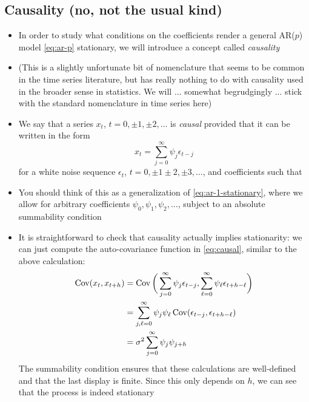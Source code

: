 \documentclass{article}
\begin{document}
\subsection{Causality (no, not the usual kind)}

\begin{itemize}
\item In order to study what conditions on the coefficients render a general
  AR($p$) model \eqref{eq:ar-p} stationary, we will introduce a concept called
  \emph{causality} 

\item (This is a slightly unfortunate bit of nomenclature that seems to be
  common in the time series literature, but has really nothing to do with
  causality used in the broader sense in statistics. We will ... somewhat
  begrudgingly ... stick with the standard nomenclature in time series here) 

\item We say that a series $x_t$, $t = 0, \pm 1, \pm 2, \dots$ is \emph{causal}
  provided that it can be written in the form
  \begin{equation}
  \label{eq:causal}
  x_t = \sum_{j=0}^\infty \psi_j \epsilon_{t-j}
  \end{equation}
  for a white noise sequence $\epsilon_t$, $t = 0, \pm 1 \pm 2, \pm
  3,\dots$, and coefficients such that 

\item You should think of this as a generalization of
  \eqref{eq:ar-1-stationary}, where we allow for arbitrary coefficients
  $\psi_0,\psi_1,\psi_2,\dots$, subject to an absolute summability condition  

\item It is straightforward to check that causality actually implies
  stationarity: we can just compute the auto-covariance function in
  \eqref{eq:causal}, similar to the above calculation:
    \begin{align*}
  \operatorname{Cov}(x_t, x_{t+h}) &= \operatorname{Cov}\bigg( \sum_{j=0}^\infty \psi_j \epsilon_{t-j}, 
  \sum_{\ell=0}^\infty \psi_\ell \epsilon_{t+h-\ell} \bigg) \\
  &= \sum_{j,\ell=0}^\infty \psi_j \psi_\ell \operatorname{Cov}( \epsilon_{t-j},
    \epsilon_{t+h-\ell} ) \\
  &= \sigma^2 \sum_{j=0}^\infty \psi_j \psi_{j+h}
  \end{align*}
  The summability condition ensures that these calculations are well-defined and
  that the last display is finite. Since this only depends on $h$, we can see
  that the process is indeed stationary


\end{itemize}
\end{document}
